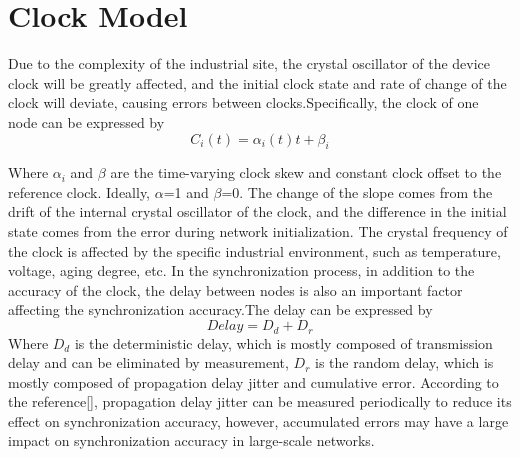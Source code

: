 \documentclass[conference]{IEEEtran}
\begin{document}
	\section{Clock Model}
	Due to the complexity of the industrial site, the crystal oscillator of the device clock will be greatly affected, and the initial clock state and rate of change of the clock will deviate, causing errors between clocks.Specifically, the clock of one node can be expressed by
	\begin{equation*}
	C_i(t) = \alpha _i(t)t + \beta _i \tag{1}
	\end{equation*}
	
	Where $\alpha_i$ and $\beta$ are the  time-varying clock skew and constant clock offset to the reference clock. Ideally, $\alpha$=1 and $\beta$=0. The change of the slope comes from the drift of the internal crystal oscillator of the clock, and the difference in the initial state comes from the error during network initialization. The crystal frequency of the clock is affected by the specific industrial environment, such as temperature, voltage, aging degree, etc. 
	In the synchronization process, in addition to the accuracy of the clock, the delay between nodes is also an important factor affecting the synchronization accuracy.The delay can be expressed by
	\begin{equation}
	Delay=D_d+D_r
	\end{equation}
	Where $D_d$ is the deterministic delay, which is mostly composed of transmission delay and can be eliminated by measurement, $D_r$ is the random delay, which is mostly composed of propagation delay jitter and cumulative error. According to the reference[], propagation delay jitter can be measured periodically to reduce its effect on synchronization accuracy, however, accumulated errors may have a large impact on synchronization accuracy in large-scale networks. 
	
	
	
\end{document}
